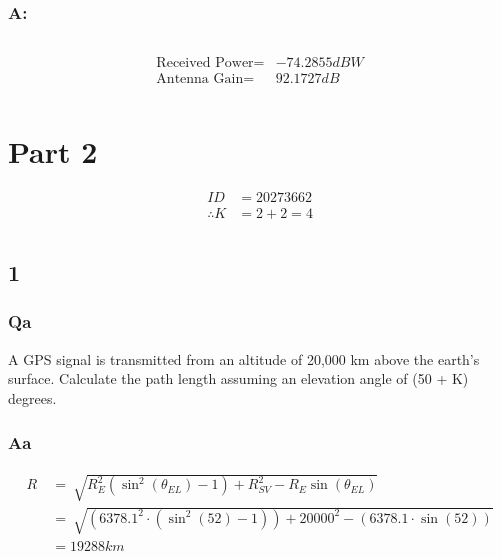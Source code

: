 \documentclass[11pt]{article}
\begin{document}
\subsubsection{A:}

\begin{scriptsize}
    \inputminted{matlab}{Project/Matlab/DOWNLINK.m}
\end{scriptsize}

\begin{equation}
    \begin{split}
        \text{Received Power} =& -74.2855dBW\\
        \text{Antenna Gain} =& 92.1727dB\\
    \end{split}
\end{equation}


\section{Part 2}\label{part2}

\begin{equation}
    \begin{split}
        ID &= 20273662\\
        \therefore K &= 2 + 2 = 4\\
    \end{split}
\end{equation}

\subsection{1}
\subsubsection{Qa}
A GPS signal is transmitted from an altitude of 20,000 km above the earth’s surface. Calculate the path length assuming an elevation angle of (50 + K) degrees.
\subsubsection{Aa}

\begin{equation}
\begin{split}
    R\ &=\ \sqrt{R_{E}^{2}\left(\sin^{2}\left(\theta_{EL}\right)-1\right)+R_{SV}^{2}-R_{E}\sin\left(\theta_{EL}\right)}\\
    &=\ \sqrt{\left(6378.1^{2}\cdot\left(\sin^{2}\left(52\right)-1\right)\right)+20000^{2}-\left(6378.1\cdot\sin\left(52\right)\right)}\\
    &= 19288 km
\end{split}
\end{equation}
\end{document}
